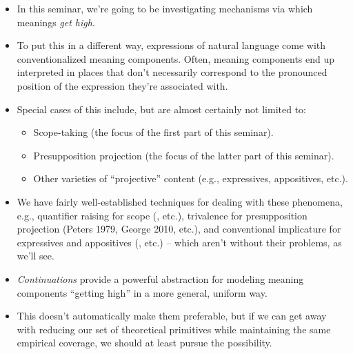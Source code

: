 \documentclass[nols,twoside,nofonts,nobib,nohyper]{tufte-handout}
\begin{document}
\begin{itemize}

    \item In this seminar, we're going to be investigating mechanisms via which
    meanings \textit{get high}.

    \item To put this in a different way, expressions of natural language come
    with conventionalized meaning components. Often, meaning components end up
    interpreted in places that don't necessarily correspond to the pronounced
    position of the expression they're associated with.

  \item Special cases of this include, but are almost certainly not limited to:

    \begin{itemize}

        \item Scope-taking (the focus of the first part of this seminar).

        \item Presupposition projection (the focus of the latter part of this seminar).

        \item Other varieties of \enquote{projective} content (e.g.,
        expressives, appositives, etc.).

     \end{itemize}

    \item We have fairly well-established techniques for dealing with these
    phenomena, e.g., quantifier raising for scope
    (\citealt{may,heimKratzer1998}, etc.), trivalence for presupposition
    projection (Peters 1979, George 2010, etc.), and conventional implicature
    for expressives and appositives
    (\citealt{potts2005,mccready2010a,gutzmann2015}, etc.) -- which aren't without their problems, as we'll see.

    \item \textit{Continuations} provide a powerful abstraction for
    modeling meaning components \enquote{getting high} in a more general,
    uniform way.

    \item This
    doesn't automatically make them preferable, but if we can get away with
    reducing our set of theoretical primitives while maintaining the same
    empirical coverage, we should at least pursue the possibility.


\end{itemize}
\end{document}
